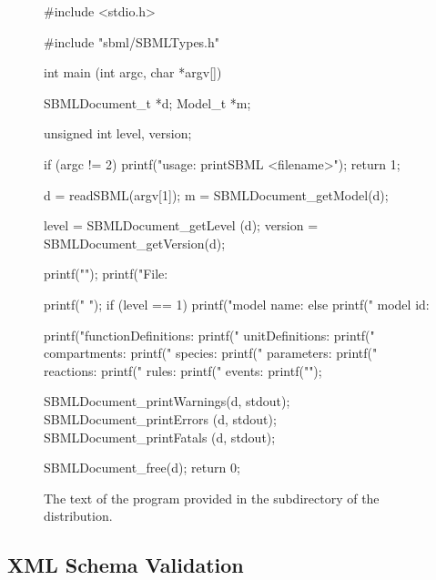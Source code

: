 \documentclass{sbmlmanual}
\begin{document}
\begin{figure}
\begin{codeVerbatim}
#include <stdio.h>

#include "sbml/SBMLTypes.h"

int
main (int argc, char *argv[])
{
  SBMLDocument_t *d;
  Model_t        *m;

  unsigned int level, version;


  if (argc != 2)
  {
    printf("\n  usage: printSBML <filename>\n\n");
    return 1;
  }

  d = readSBML(argv[1]);
  m = SBMLDocument_getModel(d);

  level    = SBMLDocument_getLevel  (d);
  version = SBMLDocument_getVersion(d);

  printf("\n");
  printf("File: %

  printf("         ");
  if (level == 1)
  {
    printf("model name: %
  }
  else
  {
    printf("  model id: %
  }

  printf("functionDefinitions: %
  printf("     unitDefinitions: %
  printf("        compartments: %
  printf("              species: %
  printf("          parameters: %
  printf("           reactions: %
  printf("                rules: %
  printf("               events: %
  printf("\n");

  SBMLDocument_printWarnings(d, stdout);
  SBMLDocument_printErrors   (d, stdout);
  SBMLDocument_printFatals   (d, stdout);

  SBMLDocument_free(d);
  return 0;
}
\end{codeVerbatim}
\caption{The text of the program  provided in the
   subdirectory of the \libsbml{} distribution.}
\label{fig:printsbml}
\end{figure}
                                        

\subsection{XML Schema Validation}
\label{sec:schema-validation}
\end{document}
